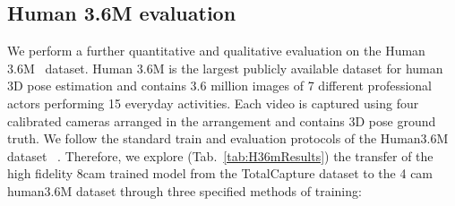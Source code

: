 \documentclass{bmvc2k}
\begin{document}
\subsection{Human 3.6M evaluation}
We perform a further quantitative and qualitative evaluation on the Human 3.6M~\cite{h36m_pami} dataset. Human 3.6M is the largest publicly available dataset for human 3D pose estimation and contains 3.6 million images of 7 different professional actors performing 15 everyday activities. Each video is captured using four calibrated cameras arranged in the  arrangement and contains 3D pose ground truth. We follow the standard train and evaluation protocols of the Human3.6M dataset ~\cite{li2015maximumH36m,tome2017liftingH36m}.
Therefore, we explore (Tab.~\ref{tab:H36mResults})
the transfer of the high fidelity 8cam trained model from the TotalCapture dataset to the 4 cam human3.6M dataset through three specified methods of training:
\end{document}

